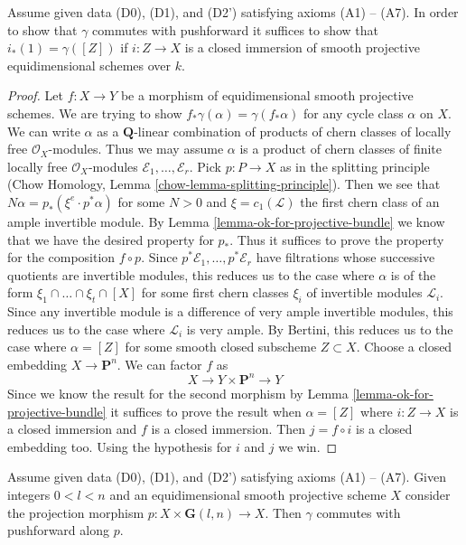\begin{lemma}
\label{lemma-enough}
Assume given data (D0), (D1), and (D2') satisfying axioms (A1) -- (A7).
In order to show that $\gamma$ commutes with pushforward it suffices
to show that $i_*(1) = \gamma([Z])$ if $i : Z \to X$ is a closed
immersion of smooth projective equidimensional schemes over $k$.
\end{lemma}

\begin{proof}
Let $f : X \to Y$ be a morphism of equidimensional smooth projective schemes.
We are trying to show $f_*\gamma(\alpha) = \gamma(f_*\alpha)$
for any cycle class $\alpha$ on $X$.
We can write $\alpha$ as a $\mathbf{Q}$-linear combination of products of
chern classes of locally free $\mathcal{O}_X$-modules.
Thus we may assume $\alpha$ is a product of chern classes of
finite locally free $\mathcal{O}_X$-modules
$\mathcal{E}_1, \ldots, \mathcal{E}_r$.
Pick $p : P \to X$ as in the splitting principle
(Chow Homology, Lemma \ref{chow-lemma-splitting-principle}).
Then we see that $N \alpha = p_*(\xi^e \cdot p^*\alpha)$
for some $N > 0$ and $\xi = c_1(\mathcal{L})$ the first
chern class of an ample invertible module.
By Lemma \ref{lemma-ok-for-projective-bundle}
we know that we have the desired property for $p_*$.
Thus it suffices to prove the property for the composition
$f \circ p$. Since $p^*\mathcal{E}_1, \ldots, p^*\mathcal{E}_r$
have filtrations whose successive quotients are invertible
modules, this reduces us to the case where $\alpha$ is
of the form $\xi_1 \cap \ldots \cap \xi_t \cap [X]$
for some first chern classes $\xi_i$ of invertible modules $\mathcal{L}_i$.
Since any invertible module is a difference of very ample
invertible modules, this reduces us to the case where
$\mathcal{L}_i$ is very ample.
By Bertini, this reduces us to the case
where $\alpha = [Z]$ for some smooth closed subscheme $Z \subset X$.
Choose a closed embedding $X \to \mathbf{P}^n$. We can factor $f$ as
$$
X \to Y \times \mathbf{P}^n \to Y
$$
Since we know the result for the second morphism by
Lemma \ref{lemma-ok-for-projective-bundle}
it suffices to prove the result when
$\alpha = [Z]$ where $i : Z \to X$ is a closed immersion 
and $f$ is a closed immersion.
Then $j = f \circ i$ is a closed embedding too.
Using the hypothesis for $i$ and $j$ we win.
\end{proof}

\begin{lemma}
\label{lemma-grassmanian}
Assume given data (D0), (D1), and (D2') satisfying axioms (A1) -- (A7).
Given integers $0 < l < n$ and an equidimensional
smooth projective scheme $X$ consider the projection morphism
$p : X \times \mathbf{G}(l, n) \to X$.
Then $\gamma$ commutes with pushforward along $p$.
\end{lemma}

